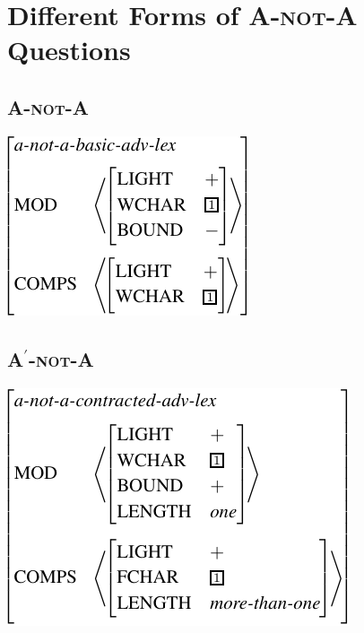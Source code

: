\documentclass[11pt]{article}
\def\anota{\textsc{A-not-A}}
\begin{document}
\section{Different Forms of {\anota} Questions}
\label{sec:forms}



\subsection{\textsc{A-not-A}}
\label{ssec:basic}




{\small 
\ex{}
\vspace{-10pt}
\newline
\includegraphics[scale=.8]{pdf/basic.pdf}
\xe}
\vspace{-20pt}


\subsection{\textsc{A\ensuremath{^\prime}-not-A}}
\label{ssec:contracted}




{\small 
\ex{}
\vspace{-10pt}
\newline
\includegraphics[scale=.8]{pdf/contracted.pdf}
\xe}
\vspace{-20pt}
\end{document}
